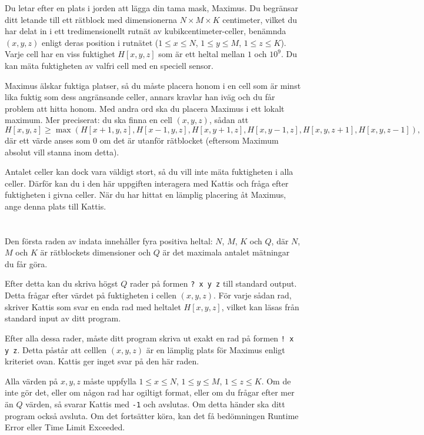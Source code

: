 \ifx\boi\undefined\fi
\def\version{jury-1}

Du letar efter en plats i jorden att lägga din tama mask, Maximus. Du begränsar ditt letande till ett rätblock med dimensionerna $N \times M \times K$ centimeter, vilket du har delat in i ett tredimensionellt rutnät av kubikcentimeter-celler, benämnda $(x,y,z)$ enligt deras position i rutnätet ($1 \le x \le N$, $1 \le y \le M$, $1 \le z \le K$). Varje cell har en viss fuktighet $H[x,y,z]$ som är ett heltal mellan $1$ och $10^9$. Du kan mäta fuktigheten av valfri cell med en speciell sensor.

Maximus älskar fuktiga platser, så du måste placera honom i en cell som är minst lika fuktig som dess angränsande celler, annars kravlar han iväg och du får problem att hitta honom. Med andra ord ska du placera Maximus i ett lokalt maximum.
Mer preciserat: du ska finna en cell $(x,y,z)$, sådan att
$$
H[x,y,z] \ge \max(H[x+1,y,z], H[x-1,y,z], H[x,y+1,z], H[x,y-1,z], H[x,y,z+1], H[x,y,z-1]),
$$
där ett värde anses som $0$ om det är utanför rätblocket (eftersom Maximum absolut vill stanna inom detta).

Antalet celler kan dock vara väldigt stort, så du vill inte mäta fuktigheten i alla celler. Därför kan du i den här uppgiften interagera med Kattis och fråga efter fuktigheten i givna celler. När du har hittat en lämplig placering åt Maximus, ange denna plats till Kattis.

\section*{\interactivity}
Den första raden av indata innehåller fyra positiva heltal: $N$, $M$, $K$ och $Q$, där $N$, $M$ och $K$ är rätblockets dimensioner och $Q$ är det maximala antalet mätningar du får göra.

Efter detta kan du skriva högst $Q$ rader på formen \texttt{?\ x y z} till standard output.
Detta frågar efter värdet på fuktigheten i cellen  $(x, y, z)$.
För varje sådan rad, skriver Kattis som svar en enda rad med heltalet $H[x,y,z]$, vilket kan läsas från standard input av ditt program.

Efter alla dessa rader, måste ditt program skriva ut exakt en rad på formen \texttt{!\ x y z}.
Detta påstår att celllen $(x, y, z)$ är en lämplig plats för Maximus enligt kriteriet ovan. Kattis ger inget svar på den här raden.

Alla värden på $x, y, z$ måste uppfylla $1 \le x \le N$, $1 \le y \le M$, $1 \le z \le K$.
Om de inte gör det, eller om någon rad har ogiltigt format, eller om du frågar efter mer än $Q$ värden,
så svarar Kattis med \texttt{-1} och avslutas. 
Om detta händer ska ditt program också avsluta. Om det fortsätter köra, kan det få bedömningen Runtime Error eller Time Limit Exceeded.

